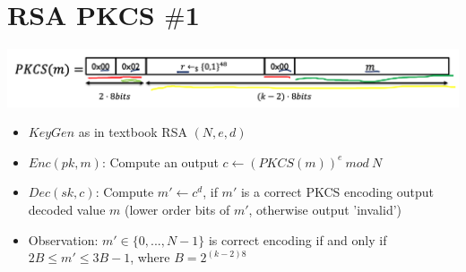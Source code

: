     \section{RSA PKCS $\#$1}
        \begin{center}
	        \includegraphics[width=140mm]{Graphics/Chosen Ciphertext Secure Public Key Encryption/cca2.png}
        \end{center}
        \begin{itemize}
            \item $KeyGen$ as in textbook RSA $(N,e,d)$
            \item $Enc(pk,m)$: Compute an output $c \leftarrow (PKCS(m))^e\ mod\ N$
            \item $Dec(sk,c)$: Compute $m' \leftarrow c^d$, if $m'$ is a correct PKCS encoding output decoded value $m$ (lower order bits of $m'$, otherwise output 'invalid')\\
            \item Observation: $m' \in \{0,...,N-1\}$ is correct encoding if and only if $2B \leq m' \leq 3B-1$, where $B = 2^{(k-2)8}$
        \end{itemize}
    
